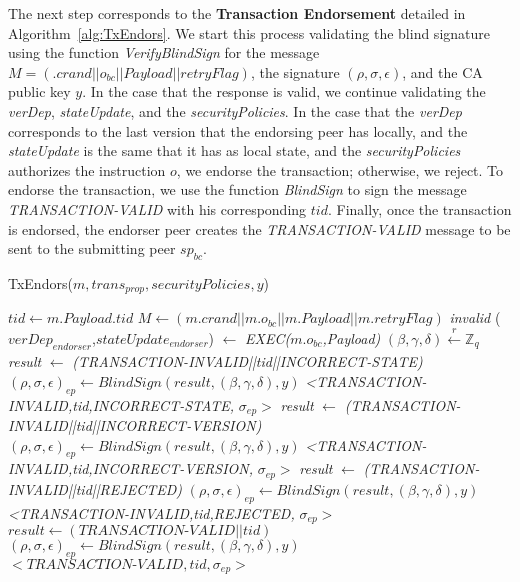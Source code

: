 \documentclass[conference]{IEEEtran}
\begin{document}
The next step corresponds to the \textbf{Transaction Endorsement} detailed in Algorithm~\ref{alg:TxEndors}. We start this process validating the blind signature using the function \textit{VerifyBlindSign} for the message $M=(.crand\vert\vert o_{bc} \vert\vert Payload \vert\vert retryFlag)$, the signature $(\rho,\sigma,\epsilon)$, and the CA public key $y$. In the case that the response is valid, we continue validating the \textit{verDep}, \textit{stateUpdate}, and the \textit{securityPolicies}. In the case that the \textit{verDep} corresponds to the last version that the endorsing peer has locally, and the \textit{stateUpdate} is the same that it has as local state, and the \textit{securityPolicies} authorizes the instruction $o$, we endorse the transaction; otherwise, we reject. To endorse the transaction, we use the function \textit{BlindSign} to sign the message \textit{TRANSACTION-VALID} with his corresponding $tid$. Finally, once the transaction is endorsed, the endorser peer creates the \textit{TRANSACTION-VALID} message to be sent to the submitting peer $sp_{bc}$.

\begin{algorithm}[ht]
\caption{TxEndors($m,trans_{prop},securityPolicies,y$)}
\label{alg:TxEndors}
\begin{algorithmic}[1]
\STATE $tid \gets m.Payload.tid$
\STATE $M \gets (m.crand\vert\vert m.o_{bc} \vert\vert m.Payload \vert\vert m.retryFlag)$
  \RETURN \emph{invalid} \ELSE
\STATE ($verDep_{endorser}$,$stateUpdate_{endorser}$) $\gets$  \emph{EXEC(}$m.o_{bc}$\emph{,Payload)} \ENDIF
\STATE $(\beta,\gamma,\delta)\xleftarrow[]{r}\mathbb{Z}_q$  
\STATE \emph{result} $\gets$ \emph{(\textit{TRANSACTION-INVALID}||tid||\textit{INCORRECT-STATE})}
\STATE $(\rho,\sigma,\epsilon)_{ep} \gets BlindSign(result,(\beta,\gamma,\delta),y)$
\RETURN \emph{<\textit{TRANSACTION-INVALID},tid,\textit{INCORRECT-STATE},} $\sigma_{ep}>$ 
\STATE \emph{result} $\gets$ \emph{(\textit{TRANSACTION-INVALID}||tid||\textit{INCORRECT-VERSION})}
\STATE $(\rho,\sigma,\epsilon)_{ep} \gets BlindSign(result,(\beta,\gamma,\delta),y)$
\RETURN \emph{<\textit{TRANSACTION-INVALID},tid,\textit{INCORRECT-VERSION},} $\sigma_{ep}>$ 
\STATE \emph{result} $\gets$ \emph{(\textit{TRANSACTION-INVALID}||tid||\textit{REJECTED})}
\STATE $(\rho,\sigma,\epsilon)_{ep} \gets BlindSign(result,(\beta,\gamma,\delta),y)$
\RETURN \emph{<\textit{TRANSACTION-INVALID},tid,\textit{REJECTED},} $\sigma_{ep}>$
\ELSE  
\STATE $result \gets (\textit{TRANSACTION-VALID}||tid)$
\STATE $(\rho,\sigma,\epsilon)_{ep} \gets BlindSign(result,(\beta,\gamma,\delta),y)$
\RETURN $<\textit{TRANSACTION-VALID},tid,\sigma_{ep}>$
\ENDIF
\end{algorithmic}
\end{algorithm}
\end{document}

